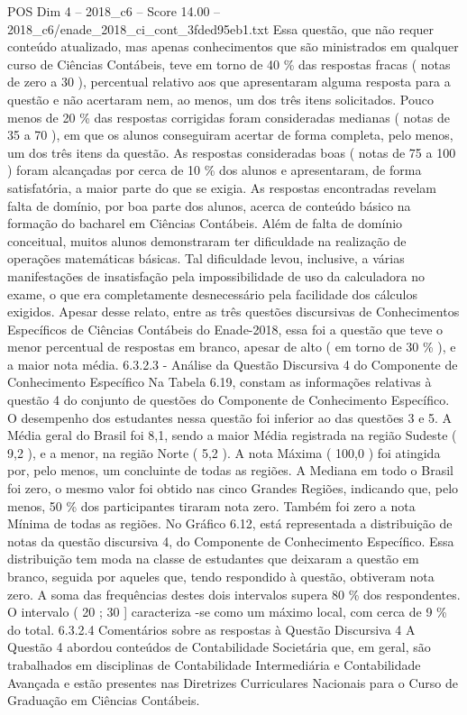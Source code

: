 \begin{textsample}{POS Dim 4 – 2018\_c6 – Score 14.00 – 2018\_c6/enade\_2018\_ci\_cont\_3fded95eb1.txt}
Essa questão, que não requer conteúdo atualizado, mas apenas conhecimentos que são ministrados em qualquer curso de Ciências Contábeis, teve em torno de 40 \% das respostas fracas ( notas de zero a 30 ), percentual relativo aos que apresentaram alguma resposta para a questão e não acertaram nem, ao menos, um dos três itens solicitados.
Pouco menos de 20 \% das respostas corrigidas foram consideradas medianas ( notas de 35 a 70 ), em que os alunos conseguiram acertar de forma completa, pelo menos, um dos três itens da questão.
As respostas consideradas boas ( notas de 75 a 100 ) foram alcançadas por cerca de 10 \% dos alunos e apresentaram, de forma satisfatória, a maior parte do que se exigia.
As respostas encontradas revelam falta de domínio, por boa parte dos alunos, acerca de conteúdo básico na formação do bacharel em Ciências Contábeis.
Além de falta de domínio conceitual, muitos alunos demonstraram ter dificuldade na realização de operações matemáticas básicas.
Tal dificuldade levou, inclusive, a várias manifestações de insatisfação pela impossibilidade de uso da calculadora no exame, o que era completamente desnecessário pela facilidade dos cálculos exigidos.
Apesar desse relato, entre as três questões discursivas de Conhecimentos Específicos de Ciências Contábeis do Enade-2018, essa foi a questão que teve o menor percentual de respostas em branco, apesar de alto ( em torno de 30 \% ), e a maior nota média. 6.3.2.3 - Análise da Questão Discursiva 4 do Componente de Conhecimento Específico Na Tabela 6.19, constam as informações relativas à questão 4 do conjunto de questões do Componente de Conhecimento Específico.
O desempenho dos estudantes nessa questão foi inferior ao das questões 3 e 5.
A Média geral do Brasil foi 8,1, sendo a maior Média registrada na região Sudeste ( 9,2 ), e a menor, na região Norte ( 5,2 ).
A nota Máxima ( 100,0 ) foi atingida por, pelo menos, um concluinte de todas as regiões.
A Mediana em todo o Brasil foi zero, o mesmo valor foi obtido nas cinco Grandes Regiões, indicando que, pelo menos, 50 \% dos participantes tiraram nota zero.
Também foi zero a nota Mínima de todas as regiões.
No Gráfico 6.12, está representada a distribuição de notas da questão discursiva 4, do Componente de Conhecimento Específico.
Essa distribuição tem moda na classe de estudantes que deixaram a questão em branco, seguida por aqueles que, tendo respondido à questão, obtiveram nota zero.
A soma das frequências destes dois intervalos supera 80 \% dos respondentes.
O intervalo ( 20 ; 30 ] caracteriza -se como um máximo local, com cerca de 9 \% do total. 6.3.2.4 Comentários sobre as respostas à Questão Discursiva 4 A Questão 4 abordou conteúdos de Contabilidade Societária que, em geral, são trabalhados em disciplinas de Contabilidade Intermediária e Contabilidade Avançada e estão presentes nas Diretrizes Curriculares Nacionais para o Curso de Graduação em Ciências Contábeis.

\end{textsample}
